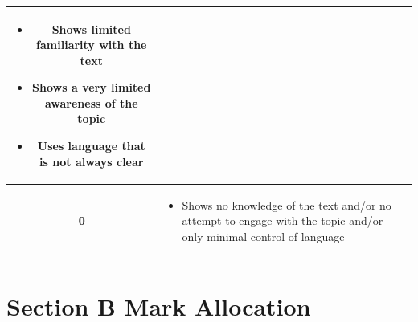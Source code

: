 \documentclass[a4paper]{article}
\begin{document}
\begin{longtable}{|c|p{13cm}|}
\begin{itemize}
  \item Shows limited familiarity with the text
  \item Shows a very limited awareness of the topic
  \item Uses language that is not always clear
\end{itemize} \\
\hline
\textbf{0} & 
\begin{itemize}
  \item Shows no knowledge of the text and/or no attempt to engage with the topic and/or only minimal control of language
\end{itemize} \\
\hline
\end{longtable}

\newpage
\section{Section B Mark Allocation}
\end{document}
